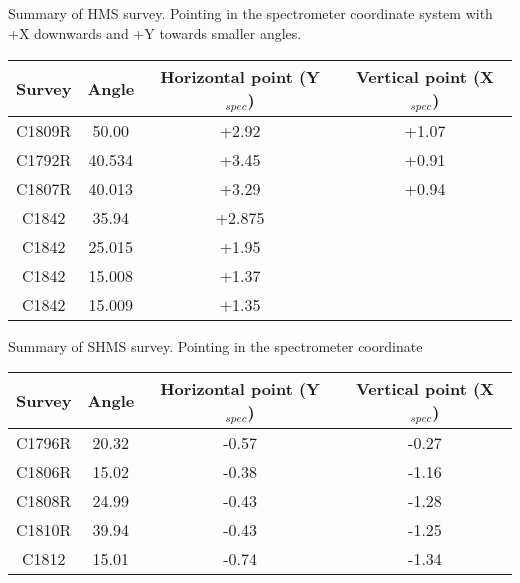 \documentclass[]{article}
\begin{document}
	
\subsection{}
	Summary of HMS survey. Pointing in the spectrometer coordinate system with +X downwards and +Y towards smaller angles.
	
	\begin{table}[h]
	\begin{center}
	\begin{tabular}[]{|c|c||c|c|} \hline\hline
		Survey & Angle  & Horizontal point (Y$_{spec}$) & Vertical point (X$_{spec}$)\\ \hline
		C1809R & 50.00  & +2.92 & +1.07 \\ \hline
		C1792R & 40.534 & +3.45& +0.91\\ \hline
		C1807R & 40.013 & +3.29 & +0.94 \\ \hline
		C1842 & 35.94 & +2.875 & \\ \hline
		C1842  & 25.015 & +1.95 &   \\ \hline
		C1842  & 15.008 & +1.37 & \\ \hline
			C1842  & 15.009 & +1.35 & \\ \hline
	\end{tabular}
			\end{center}
	\end{table}
			Summary of SHMS survey. Pointing in the spectrometer coordinate 	\begin{table}[h]
				\begin{center}
						\begin{tabular}[]{|c|c||c|c|} \hline\hline
		Survey & Angle  & Horizontal point (Y$_{spec}$) & Vertical point (X$_{spec}$)\\ \hline
		C1796R & 20.32 & -0.57& -0.27\\ \hline
		C1806R & 15.02 & -0.38 & -1.16 \\ \hline
		C1808R & 24.99  & -0.43 & -1.28 \\ \hline
		C1810R & 39.94  & -0.43 & -1.25 \\ \hline
		C1812  & 15.01  & -0.74 & -1.34 \\ \hline
		 		 	\end{tabular}
			\end{center}
		\end{table}
			
\end{document}
